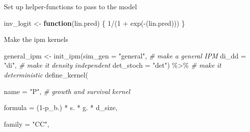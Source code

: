 \documentclass[
]{article}
\newenvironment{Shaded}{\begin{snugshade}}{\end{snugshade}}
\newcommand{\AttributeTok}[1]{\textcolor[rgb]{0.77,0.63,0.00}{#1}}
\newcommand{\CommentTok}[1]{\textcolor[rgb]{0.56,0.35,0.01}{\textit{#1}}}
\newcommand{\ControlFlowTok}[1]{\textcolor[rgb]{0.13,0.29,0.53}{\textbf{#1}}}
\newcommand{\DecValTok}[1]{\textcolor[rgb]{0.00,0.00,0.81}{#1}}
\newcommand{\FunctionTok}[1]{\textcolor[rgb]{0.00,0.00,0.00}{#1}}
\newcommand{\NormalTok}[1]{#1}
\newcommand{\OtherTok}[1]{\textcolor[rgb]{0.56,0.35,0.01}{#1}}
\newcommand{\SpecialCharTok}[1]{\textcolor[rgb]{0.00,0.00,0.00}{#1}}
\newcommand{\StringTok}[1]{\textcolor[rgb]{0.31,0.60,0.02}{#1}}
\begin{document}
Set up helper-functions to pass to the model

\begin{Shaded}
\begin{Highlighting}[]
\NormalTok{inv\_logit }\OtherTok{\textless{}{-}} \ControlFlowTok{function}\NormalTok{(lin.pred) \{}
  \DecValTok{1}\SpecialCharTok{/}\NormalTok{(}\DecValTok{1} \SpecialCharTok{+} \FunctionTok{exp}\NormalTok{(}\SpecialCharTok{{-}}\NormalTok{(lin.pred)))}
\NormalTok{\}}
\end{Highlighting}
\end{Shaded}

Make the ipm kernels

\begin{Shaded}
\begin{Highlighting}[]
\NormalTok{general\_ipm }\OtherTok{\textless{}{-}} \FunctionTok{init\_ipm}\NormalTok{(}\AttributeTok{sim\_gen =} \StringTok{"general"}\NormalTok{, }\CommentTok{\# make a general IPM}
                        \AttributeTok{di\_dd =} \StringTok{"di"}\NormalTok{, }\CommentTok{\# make it density independent}
                        \AttributeTok{det\_stoch =} \StringTok{"det"}\NormalTok{) }\SpecialCharTok{\%\textgreater{}\%} \CommentTok{\# make it deterministic}
  \FunctionTok{define\_kernel}\NormalTok{(}
    
    \AttributeTok{name          =} \StringTok{"P"}\NormalTok{, }\CommentTok{\# growth and survival kernel}
    
    \AttributeTok{formula       =}\NormalTok{ (}\DecValTok{1}\SpecialCharTok{{-}}\NormalTok{p\_b.) }\SpecialCharTok{*}\NormalTok{ s. }\SpecialCharTok{*}\NormalTok{ g. }\SpecialCharTok{*}\NormalTok{ d\_size,}
    
    \AttributeTok{family        =} \StringTok{"CC"}\NormalTok{,}
    

\end{Highlighting}
\end{Shaded}
\end{document}
